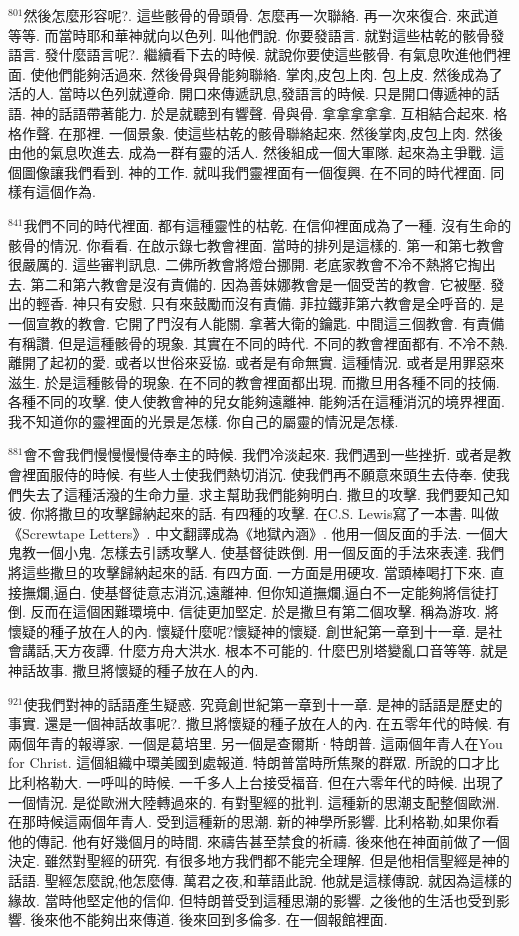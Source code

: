 \documentclass{book}
\begin{document}
$^{801}$然後怎麼形容呢?.
這些骸骨的骨頭骨.
怎麼再一次聯絡.
再一次來復合.
來武道等等.
而當時耶和華神就向以色列.
叫他們說.
你要發語言.
就對這些枯乾的骸骨發語言.
發什麼語言呢?.
繼續看下去的時候.
就說你要使這些骸骨.
有氣息吹進他們裡面.
使他們能夠活過來.
然後骨與骨能夠聯絡.
掌肉,皮包上肉.
包上皮.
然後成為了活的人.
當時以色列就遵命.
開口來傳遞訊息,發語言的時候.
只是開口傳遞神的話語.
神的話語帶著能力.
於是就聽到有響聲.
骨與骨.
拿拿拿拿拿.
互相結合起來.
格格作聲.
在那裡.
一個景象.
使這些枯乾的骸骨聯絡起來.
然後掌肉,皮包上肉.
然後由他的氣息吹進去.
成為一群有靈的活人.
然後組成一個大軍隊.
起來為主爭戰.
這個圖像讓我們看到.
神的工作.
就叫我們靈裡面有一個復興.
在不同的時代裡面.
同樣有這個作為.

$^{841}$我們不同的時代裡面.
都有這種靈性的枯乾.
在信仰裡面成為了一種.
沒有生命的骸骨的情況.
你看看.
在啟示錄七教會裡面.
當時的排列是這樣的.
第一和第七教會很嚴厲的.
這些審判訊息.
二佛所教會將燈台挪開.
老底家教會不冷不熱將它掏出去.
第二和第六教會是沒有責備的.
因為善妹娜教會是一個受苦的教會.
它被壓.
發出的輕香.
神只有安慰.
只有來鼓勵而沒有責備.
菲拉鐵菲第六教會是全呼音的.
是一個宣教的教會.
它開了門沒有人能關.
拿著大衛的鑰匙.
中間這三個教會.
有責備有稱讚.
但是這種骸骨的現象.
其實在不同的時代.
不同的教會裡面都有.
不冷不熱.
離開了起初的愛.
或者以世俗來妥協.
或者是有命無實.
這種情況.
或者是用罪惡來滋生.
於是這種骸骨的現象.
在不同的教會裡面都出現.
而撒旦用各種不同的技倆.
各種不同的攻擊.
使人使教會神的兒女能夠遠離神.
能夠活在這種消沉的境界裡面.
我不知道你的靈裡面的光景是怎樣.
你自己的屬靈的情況是怎樣.

$^{881}$會不會我們慢慢慢慢侍奉主的時候.
我們冷淡起來.
我們遇到一些挫折.
或者是教會裡面服侍的時候.
有些人士使我們熱切消沉.
使我們再不願意來頭生去侍奉.
使我們失去了這種活潑的生命力量.
求主幫助我們能夠明白.
撒旦的攻擊.
我們要知己知彼.
你將撒旦的攻擊歸納起來的話.
有四種的攻擊.
在C.S. Lewis寫了一本書.
叫做《Screwtape Letters》.
中文翻譯成為《地獄內涵》.
他用一個反面的手法.
一個大鬼教一個小鬼.
怎樣去引誘攻擊人.
使基督徒跌倒.
用一個反面的手法來表達.
我們將這些撒旦的攻擊歸納起來的話.
有四方面.
一方面是用硬攻.
當頭棒喝打下來.
直接撫爛,逼白.
使基督徒意志消沉,遠離神.
但你知道撫爛,逼白不一定能夠將信徒打倒.
反而在這個困難環境中.
信徒更加堅定.
於是撒旦有第二個攻擊.
稱為游攻.
將懷疑的種子放在人的內.
懷疑什麼呢?懷疑神的懷疑.
創世紀第一章到十一章.
是社會講話,天方夜譚.
什麼方舟大洪水.
根本不可能的.
什麼巴別塔變亂口音等等.
就是神話故事.
撒旦將懷疑的種子放在人的內.

$^{921}$使我們對神的話語產生疑惑.
究竟創世紀第一章到十一章.
是神的話語是歷史的事實.
還是一個神話故事呢?.
撒旦將懷疑的種子放在人的內.
在五零年代的時候.
有兩個年青的報導家.
一個是葛培里.
另一個是查爾斯·特朗普.
這兩個年青人在You for Christ.
這個組織中環美國到處報道.
特朗普當時所焦聚的群眾.
所說的口才比比利格勒大.
一呼叫的時候.
一千多人上台接受福音.
但在六零年代的時候.
出現了一個情況.
是從歐洲大陸轉過來的.
有對聖經的批判.
這種新的思潮支配整個歐洲.
在那時候這兩個年青人.
受到這種新的思潮.
新的神學所影響.
比利格勒,如果你看他的傳記.
他有好幾個月的時間.
來禱告甚至禁食的祈禱.
後來他在神面前做了一個決定.
雖然對聖經的研究.
有很多地方我們都不能完全理解.
但是他相信聖經是神的話語.
聖經怎麼說,他怎麼傳.
萬君之夜,和華語此說.
他就是這樣傳說.
就因為這樣的緣故.
當時他堅定他的信仰.
但特朗普受到這種思潮的影響.
之後他的生活也受到影響.
後來他不能夠出來傳道.
後來回到多倫多.
在一個報館裡面.
\end{document}

